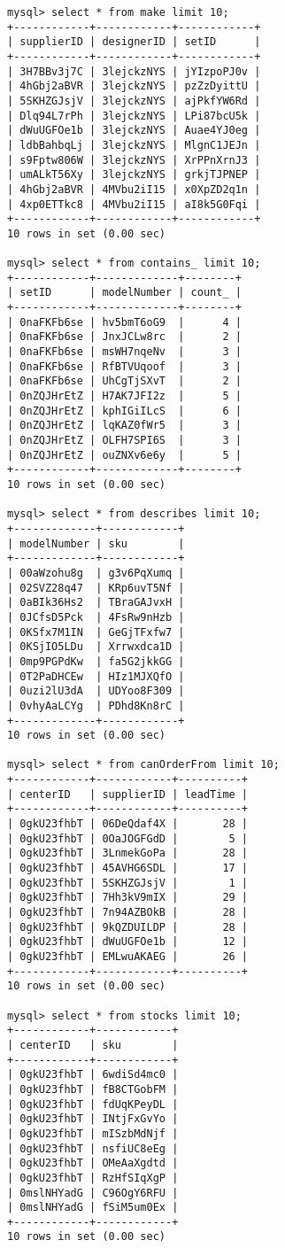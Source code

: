 \documentclass[american,extrafontsizes,12pt,portrait,letterpaper,oneside,onecolumn,article,final]{memoir}
\begin{document}
\begin{verbatim}
mysql> select * from make limit 10;
+------------+------------+------------+
| supplierID | designerID | setID      |
+------------+------------+------------+
| 3H7BBv3j7C | 3lejckzNYS | jYIzpoPJ0v |
| 4hGbj2aBVR | 3lejckzNYS | pzZzDyittU |
| 5SKHZGJsjV | 3lejckzNYS | ajPkfYW6Rd |
| Dlq94L7rPh | 3lejckzNYS | LPi87bcU5k |
| dWuUGFOe1b | 3lejckzNYS | Auae4YJ0eg |
| ldbBahbqLj | 3lejckzNYS | MlgnC1JEJn |
| s9Fptw806W | 3lejckzNYS | XrPPnXrnJ3 |
| umALkT56Xy | 3lejckzNYS | grkjTJPNEP |
| 4hGbj2aBVR | 4MVbu2iI15 | x0XpZD2q1n |
| 4xp0ETTkc8 | 4MVbu2iI15 | aI8k5G0Fqi |
+------------+------------+------------+
10 rows in set (0.00 sec)

mysql> select * from contains_ limit 10;
+------------+-------------+--------+
| setID      | modelNumber | count_ |
+------------+-------------+--------+
| 0naFKFb6se | hv5bmT6oG9  |      4 |
| 0naFKFb6se | JnxJCLw8rc  |      2 |
| 0naFKFb6se | msWH7nqeNv  |      3 |
| 0naFKFb6se | RfBTVUqoof  |      3 |
| 0naFKFb6se | UhCgTjSXvT  |      2 |
| 0nZQJHrEtZ | H7AK7JFI2z  |      5 |
| 0nZQJHrEtZ | kphIGiILcS  |      6 |
| 0nZQJHrEtZ | lqKAZ0fWr5  |      3 |
| 0nZQJHrEtZ | OLFH7SPI6S  |      3 |
| 0nZQJHrEtZ | ouZNXv6e6y  |      5 |
+------------+-------------+--------+
10 rows in set (0.00 sec)

mysql> select * from describes limit 10;
+-------------+------------+
| modelNumber | sku        |
+-------------+------------+
| 00aWzohu8g  | g3v6PqXumq |
| 02SVZ28q47  | KRp6uvT5Nf |
| 0aBIk36Hs2  | TBraGAJvxH |
| 0JCfsD5Pck  | 4FsRw9nHzb |
| 0KSfx7M1IN  | GeGjTFxfw7 |
| 0KSjIO5LDu  | Xrrwxdca1D |
| 0mp9PGPdKw  | fa5G2jkkGG |
| 0T2PaDHCEw  | HIz1MJXQfO |
| 0uzi2lU3dA  | UDYoo8F309 |
| 0vhyAaLCYg  | PDhd8Kn8rC |
+-------------+------------+
10 rows in set (0.00 sec)

mysql> select * from canOrderFrom limit 10;
+------------+------------+----------+
| centerID   | supplierID | leadTime |
+------------+------------+----------+
| 0gkU23fhbT | 06DeQdaf4X |       28 |
| 0gkU23fhbT | 0OaJOGFGdD |        5 |
| 0gkU23fhbT | 3LnmekGoPa |       28 |
| 0gkU23fhbT | 45AVHG6SDL |       17 |
| 0gkU23fhbT | 5SKHZGJsjV |        1 |
| 0gkU23fhbT | 7Hh3kV9mIX |       29 |
| 0gkU23fhbT | 7n94AZBOkB |       28 |
| 0gkU23fhbT | 9kQZDUILDP |       28 |
| 0gkU23fhbT | dWuUGFOe1b |       12 |
| 0gkU23fhbT | EMLwuAKAEG |       26 |
+------------+------------+----------+
10 rows in set (0.00 sec)

mysql> select * from stocks limit 10;
+------------+------------+
| centerID   | sku        |
+------------+------------+
| 0gkU23fhbT | 6wdiSd4mc0 |
| 0gkU23fhbT | fB8CTGobFM |
| 0gkU23fhbT | fdUqKPeyDL |
| 0gkU23fhbT | INtjFxGvYo |
| 0gkU23fhbT | mISzbMdNjf |
| 0gkU23fhbT | nsfiUC8eEg |
| 0gkU23fhbT | OMeAaXgdtd |
| 0gkU23fhbT | RzHfSIqXgP |
| 0mslNHYadG | C96OgY6RFU |
| 0mslNHYadG | fSiM5um0Ex |
+------------+------------+
10 rows in set (0.00 sec)


\end{verbatim}
\end{document}
